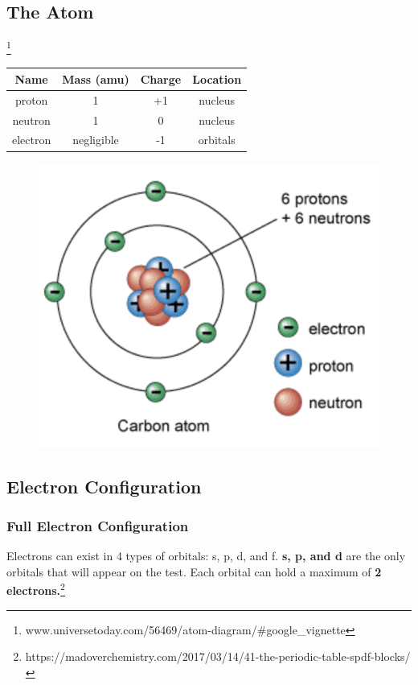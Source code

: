 \documentclass[a4paper, 12pt]{article}
\begin{document}
\subsection{The Atom}\footnote{www.universetoday.com/56469/atom-diagram/\#google\_vignette}

\begin{center}
\begin{tabular}{c|c|c|c}

     \textbf{Name} & \textbf{Mass (amu)} & \textbf{Charge} & \textbf{Location} \\\hline
     proton & 1 & +1 & nucleus \\
     neutron & 1 & 0 & nucleus \\
     electron & negligible & -1 & orbitals 
\end{tabular}
\end{center}

\begin{figure}[H]
    \centering
    \includegraphics[width=0.5\linewidth]{atom.png}
    \label{fig:lalalalalalalla}
\end{figure}

\subsection{Electron Configuration}
\subsubsection{Full Electron Configuration}
Electrons can exist in 4 types of orbitals: s, p, d, and f. \textbf{s, p, and d} are the only orbitals that will appear on the test. Each orbital can hold a maximum of \textbf{2 electrons.}\footnote{https://madoverchemistry.com/2017/03/14/41-the-periodic-table-spdf-blocks/}
\end{document}
